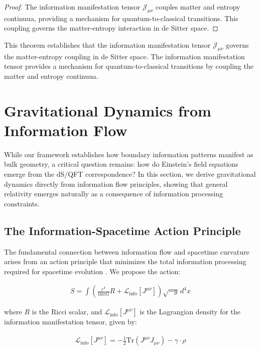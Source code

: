 \documentclass[11pt,english,twoside]{article}
\theoremstyle{plain}
\theoremstyle{definition}
\theoremstyle{remark}
\newcommand{\J}{{\mathcal{J}}}
\newcommand{\gammaR}{\gamma}
\begin{document}
\begin{proof}
The information manifestation tensor $\J_{\mu\nu}$ couples matter and entropy continuua, providing a mechanism for quantum-to-classical transitions. This coupling governs the matter-entropy interaction in de Sitter space.
\end{proof}

This theorem establishes that the information manifestation tensor $\J_{\mu\nu}$ governs the matter-entropy coupling in de Sitter space. The information manifestation tensor provides a mechanism for quantum-to-classical transitions by coupling the matter and entropy continuua.

\section{Gravitational Dynamics from Information Flow}
\label{sec:gravitational_dynamics}

While our framework establishes how boundary information patterns manifest as bulk geometry, a critical question remains: how do Einstein's field equations emerge from the dS/QFT correspondence? In this section, we derive gravitational dynamics directly from information flow principles, showing that general relativity emerges naturally as a consequence of information processing constraints.

\subsection{The Information-Spacetime Action Principle}

The fundamental connection between information flow and spacetime curvature arises from an action principle that minimizes the total information processing required for spacetime evolution \cite{Jacobson2015}. We propose the action:

\begin{align}
S = \int \left(\frac{c^4}{16\pi G}R + \mathcal{L}_{\text{info}}[J^{\mu\nu}]\right) \sqrt{-g} \, d^4x
\end{align}

where $R$ is the Ricci scalar, and $\mathcal{L}_{\text{info}}[J^{\mu\nu}]$ is the Lagrangian density for the information manifestation tensor, given by:

\begin{align}
\mathcal{L}_{\text{info}}[J^{\mu\nu}] = -\frac{1}{2}\text{Tr}(J^{\mu\nu}J_{\mu\nu}) - \gammaR \cdot \rho
\end{align}
\end{document}
